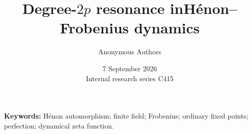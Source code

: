 \documentclass[11pt]{article}
\title{Degree-$2p$ resonance in\newline H\'enon--Frobenius dynamics}
\author{Anonymous Authors}
\date{7 September 2026\\[3pt]{\small Internal research series C415}}
\begin{document}
\maketitle
\begin{abstract}

\end{abstract}
\noindent\textbf{Keywords:} H\'enon automorphism; finite field; Frobenius;
ordinary fixed points; perfection; dynamical zeta function.








\begingroup
\small


\endgroup
\end{document}

